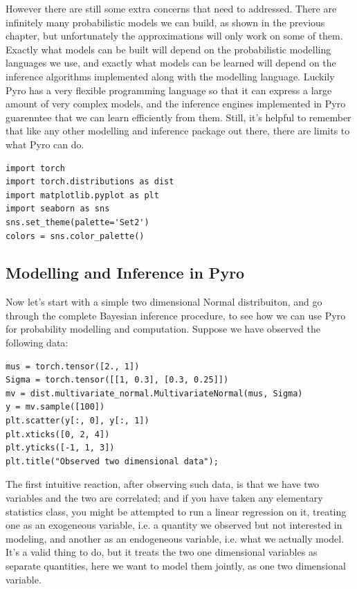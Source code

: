\documentclass[11pt]{article}
\begin{document}
However there are still some extra concerns that need to addressed. There are infinitely many probabilistic models we can build, as shown in the previous chapter, but unfortunately the approximations will only work on some of them. Exactly what models can be built will depend on the probabilistic modelling languages we use, and exactly what models can be learned will depend on the inference algorithms implemented along with the modelling language. Luckily Pyro has a very flexible programming language so that it can express a large amount of very complex models, and the inference engines implemented in Pyro guarenntee that we can learn efficiently from them. Still, it's helpful to remember that like any other modelling and inference package out there, there are limits to what Pyro can do.

\begin{verbatim}
import torch
import torch.distributions as dist
import matplotlib.pyplot as plt
import seaborn as sns
sns.set_theme(palette='Set2')
colors = sns.color_palette()
\end{verbatim}

\subsection{Modelling and Inference in Pyro}
\label{sec:org67d8f9e}

Now let's start with a simple two dimensional Normal distribuiton, and go through the complete Bayesian inference procedure, to see how we can use Pyro for probability modelling and computation. Suppose we have observed the following data:

\begin{verbatim}
mus = torch.tensor([2., 1])
Sigma = torch.tensor([[1, 0.3], [0.3, 0.25]])
mv = dist.multivariate_normal.MultivariateNormal(mus, Sigma)
y = mv.sample([100])
plt.scatter(y[:, 0], y[:, 1])
plt.xticks([0, 2, 4])
plt.yticks([-1, 1, 3])
plt.title("Observed two dimensional data");
\end{verbatim}

The first intuitive reaction, after observing such data, is that we have two variables and the two are correlated; and if you have taken any elementary statistics class, you might be attempted to run a linear regression on it, treating one as an exogeneous variable, i.e. a quantity we observed but not interested in modeling, and another as an endogeneous variable, i.e. what we actually model. It's a valid thing to do, but it treats the two one dimensional variables as separate quantities, here we want to model them jointly, as one two dimensional variable.
\end{document}
